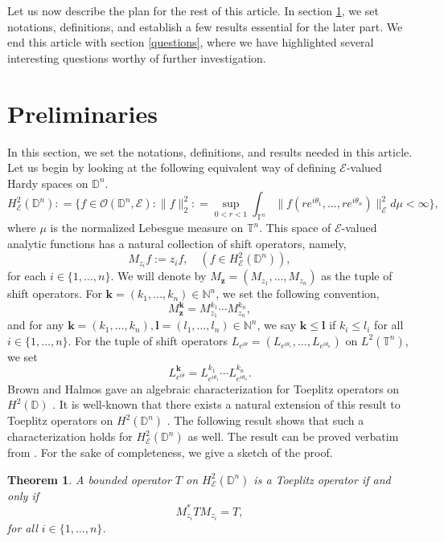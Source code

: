 \documentclass[12pt]{amsart}
\newtheorem{thm}[propn]{Theorem}
\theoremstyle{definition}
\newcommand{\Nat}{\mathbb{N}}
\newcommand{\D}{\mathbb{D}}
\newcommand{\1}{{\mbox{\bf 1}}}
\newcommand{\cle}{\mathcal{E}}
\begin{document}
Let us now describe the plan for the rest of this article. In section \ref{prelim}, we set notations, definitions, and establish a few results essential for the later part. We end this article with section \ref{questions}, where we have highlighted several interesting questions worthy of further investigation.

\section{Preliminaries}\label{prelim}
In this section, we set the notations, definitions, and results needed in this article.  Let us begin by looking at the following equivalent way of defining $\cle$-valued Hardy spaces on $\D^n$.
{\small 
\[
H_{\cle}^2(\D^n): = \{f \in \mathcal{O}(\D^n, \cle): \|f\|_2^2: = \sup_{0<r<1} \int_{\mathbb{T}^n} \|f(re^{i \theta_1}, \ldots, re^{i \theta_n})\|_{\cle}^2 d\mu < \infty\},
\]
}
where $\mu$ is the normalized Lebesgue measure on $\mathbb{T}^n$. This space of $\cle$-valued analytic functions has a natural collection of shift operators, namely,
\[
M_{z_i} f := z_i f, \quad (f \in H_{\cle}^2(\D^n)),
\]
for each $i \in \{1,\ldots,n\}$. We will denote by $M_{\bm{z}} = (M_{z_1},\ldots, M_{z_n})$ as the tuple of shift operators. For $\bm{k} = (k_1,\ldots,k_n) \in \Nat^n$, we set the following convention,
\[
M_{\bm{z}}^{\bm{k}} = M_{z_1}^{k_1} \cdots M_{z_n}^{k_n},
\]
and for any $\bm{k} = (k_1,\ldots,k_n), \bm{l} = (l_1, \ldots, l_n) \in \Nat^n$, we say $\bm{k} \leq  \bm{l}$ if $k_i \leq l_i$ for all $i \in \{1,\ldots,n\}$. For the tuple of shift operators $L_{e^{i\theta}} = (L_{e^{i\theta_1}}, \ldots, L_{e^{i\theta_n}})$ on  $L^2(\mathbb{T}^n)$, we set
\[
L_{e^{i\theta}}^{\bm{k}} = L_{e^{i \theta_1}}^{k_1} \cdots L_{e^{i \theta_n}}^{k_n}.
\]
Brown and Halmos gave an algebraic characterization for Toeplitz operators on $H^2(\D)$ \cite{BH}. It is well-known that there exists a natural extension of this result to Toeplitz operators on $H^2(\D^n)$ \cite{MSS}. The following result shows that such a characterization holds for $H_{\cle}^2(\D^n)$ as well. The result can be proved verbatim from \cite[Theorem 3.1, Theorem 5.2]{MSS}. For the sake of completeness, we give a sketch of the proof. 
\begin{thm}\label{Toep_char}
A bounded operator $T$ on $H_{\cle}^2(\D^n)$ is a Toeplitz operator if and only if 
\[
M_{z_i}^* T M_{z_i} = T,
\]
for all $i \in \{1,\ldots,n\}$. 
\end{thm}
\end{document}
